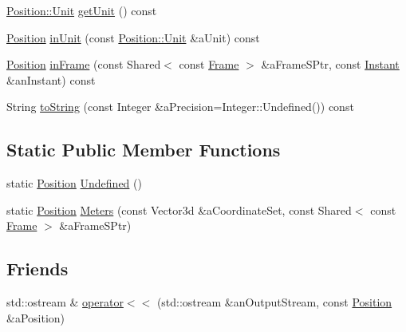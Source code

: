 \begin{DoxyCompactItemize}
\hyperlink{classlibrary_1_1physics_1_1units_1_1_length_a3b8b39cd245cf6b19dc34459baeccb18}{Position\+::\+Unit} \hyperlink{classlibrary_1_1physics_1_1coord_1_1_position_a1b6173fd9226069e36ac075b444be794}{get\+Unit} () const
\item 
\hyperlink{classlibrary_1_1physics_1_1coord_1_1_position}{Position} \hyperlink{classlibrary_1_1physics_1_1coord_1_1_position_a908878d741ad2de6a2d278d2d674e949}{in\+Unit} (const \hyperlink{classlibrary_1_1physics_1_1units_1_1_length_a3b8b39cd245cf6b19dc34459baeccb18}{Position\+::\+Unit} \&a\+Unit) const
\item 
\hyperlink{classlibrary_1_1physics_1_1coord_1_1_position}{Position} \hyperlink{classlibrary_1_1physics_1_1coord_1_1_position_adc0e64905c2463bcaf9d53a08b3426fb}{in\+Frame} (const Shared$<$ const \hyperlink{classlibrary_1_1physics_1_1coord_1_1_frame}{Frame} $>$ \&a\+Frame\+S\+Ptr, const \hyperlink{classlibrary_1_1physics_1_1time_1_1_instant}{Instant} \&an\+Instant) const
\item 
String \hyperlink{classlibrary_1_1physics_1_1coord_1_1_position_ab88010154fdbcb36b0e25b3986bcc80c}{to\+String} (const Integer \&a\+Precision=Integer\+::\+Undefined()) const
\end{DoxyCompactItemize}
\subsection*{Static Public Member Functions}
\begin{DoxyCompactItemize}
\item 
static \hyperlink{classlibrary_1_1physics_1_1coord_1_1_position}{Position} \hyperlink{classlibrary_1_1physics_1_1coord_1_1_position_a65f80401df5fa5c1eab7e3bdf1b8f8c5}{Undefined} ()
\item 
static \hyperlink{classlibrary_1_1physics_1_1coord_1_1_position}{Position} \hyperlink{classlibrary_1_1physics_1_1coord_1_1_position_a7ef7cc80563339b3f4727f508d19875c}{Meters} (const Vector3d \&a\+Coordinate\+Set, const Shared$<$ const \hyperlink{classlibrary_1_1physics_1_1coord_1_1_frame}{Frame} $>$ \&a\+Frame\+S\+Ptr)
\end{DoxyCompactItemize}
\subsection*{Friends}
\begin{DoxyCompactItemize}
\item 
std\+::ostream \& \hyperlink{classlibrary_1_1physics_1_1coord_1_1_position_aab9f362c268370239ccad2c8a6d0eaee}{operator$<$$<$} (std\+::ostream \&an\+Output\+Stream, const \hyperlink{classlibrary_1_1physics_1_1coord_1_1_position}{Position} \&a\+Position)
\end{DoxyCompactItemize}


